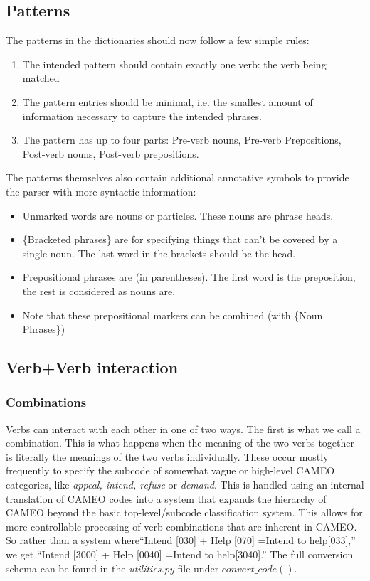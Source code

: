 \documentclass[11pt]{article}
\begin{document}
\subsection{Patterns}
The patterns in the dictionaries should now follow a few simple rules:
\begin{enumerate}
  \item The intended pattern should contain exactly one verb: the verb being 
  matched
  \item The pattern entries should be minimal, i.e. the smallest 
  amount of information necessary to capture the intended phrases.
  \item The pattern has up to four parts: Pre-verb nouns, Pre-verb Prepositions,
  Post-verb nouns, Post-verb prepositions. 
\end{enumerate}
The patterns themselves also contain additional annotative symbols to provide 
the parser with more syntactic information:
\begin{itemize}
  \item Unmarked words are nouns or particles. These nouns are phrase heads.
  \item \{Bracketed phrases\} are for specifying things that can't be covered by 
  a single noun. The last word in the brackets should be the head. 
  \item Prepositional phrases are (in parentheses). The first word is the 
  preposition, the rest is considered as nouns are.
  \item Note that these prepositional markers can be combined (with \{Noun Phrases\})
\end{itemize}
\subsection{Verb+Verb interaction}
\subsubsection{Combinations}
Verbs can interact with each other in one of two ways. The first is what we 
call a combination. This is what happens when the meaning of the two verbs 
together is literally the meanings of the two verbs individually. These occur 
mostly frequently to specify the subcode of somewhat vague or high-level 
CAMEO categories, like \textit{appeal, intend, refuse} or \textit{demand}.
This is handled using an internal translation of CAMEO codes into a system that
expands the hierarchy of CAMEO beyond the basic top-level/subcode classification
system. This allows for more controllable processing of verb combinations that 
are inherent in CAMEO. So rather than a system where``Intend [030] + Help [070] =Intend to help[033],''
we get ``Intend [3000] + Help [0040] =Intend to help[3040].'' The full 
conversion schema can be found in the \textit{utilities.py} file under 
$convert\_code()$. 
\end{document}
